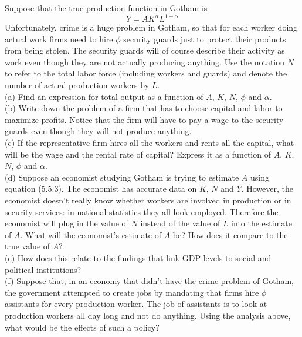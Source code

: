 \documentclass[12pt, letterpaper]{article}
\begin{document}
\begin{tcolorbox}[oddbox,title={Problem 5.5 \quad Sources of TFP}]
\begin{tcolorbox}[questionbox]
Suppose that the true production function in Gotham is
\[
Y=AK^{\alpha}L^{1-\alpha}
\tag{5.5.3}
\]
Unfortunately, crime is a huge problem in Gotham, so that for each worker doing actual work
firms need to hire $\phi$ security guards just to protect their products from being stolen.
The security guards will of course describe their activity as work even though they are not
actually producing anything. Use the notation $N$ to refer to the total labor force
(including workers and guards) and denote the number of actual production workers by
$L$.\\[3pt]
(a) Find an expression for total output as a function of $A$, $K$, $N$, $\phi$ and
$\alpha$.\\[3pt]
(b) Write down the problem of a firm that has to choose capital and labor to maximize
profits. Notice that the firm will have to pay a wage to the security guards even though
they will not produce anything.\\[3pt]
(c) If the representative firm hires all the workers and rents all the capital, what will be
the wage and the rental rate of capital? Express it as a function of $A$, $K$, $N$, $\phi$
and $\alpha$.\\[3pt]
(d) Suppose an economist studying Gotham is trying to estimate $A$ using equation (5.5.3).
The economist has accurate data on $K$, $N$ and $Y$. However, the economist doesn't really
know whether workers are involved in production or in security services: in national
statistics they all look employed. Therefore the economist will plug in the value of $N$
instead of the value of $L$ into the estimate of $A$. What will the economist's estimate of
$A$ be? How does it compare to the true value of $A$?\\[3pt]
(e) How does this relate to the findings that link GDP levels to social and political
institutions?\\[3pt]
(f) Suppose that, in an economy that didn't have the crime problem of Gotham, the government
attempted to create jobs by mandating that firms hire $\phi$ assistants for every production
worker. The job of assistants is to look at production workers all day long and not do
anything. Using the analysis above, what would be the effects of such a policy?
\end{tcolorbox}


\end{tcolorbox}
\end{document}
